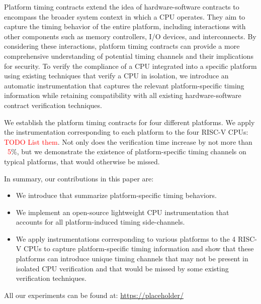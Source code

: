 Platform timing contracts extend the idea of hardware-software contracts to encompass the broader system context in which a CPU operates.
They aim to capture the timing behavior of the entire platform, including interactions with other components such as memory controllers, I/O devices, and interconnects.
By considering these interactions, platform timing contracts can provide a more comprehensive understanding of potential timing channels and their implications for security.
To verify the compliance of a CPU integrated into a specific platform using existing techniques that verify a CPU in isolation, we introduce an automatic instrumentation that captures the relevant platform-specific timing information while retaining compatibility with all existing hardware-software contract verification techniques.

We establish the platform timing contracts for four different platforms.
We apply the instrumentation corresponding to each platform to the four RISC-V CPUs: \textcolor{red}{TODO List them}.
Not only does the verification time increase by not more than ~\textcolor{red}{5}\%, but we demonstrate the existence of platform-specific timing channels on typical platforms, that would otherwise be missed.

In summary, our contributions in this paper are:
\begin{itemize}
    \item We introduce \pics that summarize platform-specific timing behaviors.
    \item We implement an open-source lightweight CPU instrumentation that accounts for all platform-induced timing side-channels.
    \item We apply instrumentations corresponding to various platforms to the 4 RISC-V CPUs to capture platform-specific timing information and show that these platforms can introduce unique timing channels that may not be present in isolated CPU verification and that would be missed by some existing verification techniques.
\end{itemize}

\vspace*{0.5em}
All our experiments can be found at: \url{https://placeholder/} 
